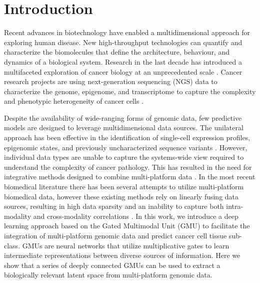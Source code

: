 \chapter{Introduction}\label{chap:introduction}

Recent advances in biotechnology have enabled a multidimensional approach for exploring human disease. New high-throughput technologies can quantify and characterize the biomolecules that define the architecture, behaviour, and dynamics of a biological system. Research in the last decade has introduced a multifaceted exploration of cancer biology at an unprecedented scale \cite{kashyap2015big}. Cancer research projects are using next-generation sequencing (NGS) data to characterize the genome, epigenome, and transcriptome to capture the complexity and phenotypic heterogeneity of cancer cells \cite{encode2012integrated}. 

Despite the availability of wide-ranging forms of genomic data, few predictive models are designed to leverage multidimensional data sources. The unilateral approach has been effective in the identification of single-cell expression profiles, epigenomic states, and previously uncharacterized sequence variants \cite{kundaje2015integrative,huang2017fast}. However, individual data types are unable to capture the systems-wide view required to understand the complexity of cancer pathology. This has resulted in the need for integrative methods designed to combine multi-platform data \cite{zitnik2019machine}. In the most recent biomedical literature there has been several attempts to utilize multi-platform biomedical data, however these existing methods rely on linearly fusing data sources, resulting in high data sparsity and an inability to capture both intra-modality and cross-modality correlations \cite{sun2018multimodal,liang2015integrative,le2010integrative}. In this work, we introduce a deep learning approach based on the Gated Multimodal Unit (GMU) to facilitate the integration of multi-platform genomic data and predict cancer cell tissue sub-class. GMUs are neural networks that utilize multiplicative gates to learn intermediate representations between diverse sources of information. Here we show that a series of deeply connected GMUs can be used to extract a biologically relevant latent space from multi-platform genomic data. 

